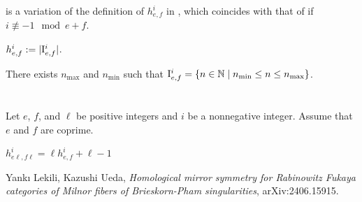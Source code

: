 
 is a variation
of the definition of $h_{e,f}^i$ in \cite{2406.15915},
which coincides with that of \cite{2406.15915}
if $i \not \equiv -1 \mod e+f$.

\begin{definition}
\label{def:h}
\leanok
$
h_{e,f}^i
:=
|\mathrm{I}_{e,f}^i|
$.
\end{definition}

\begin{lemma}
There exists $n_{\max}$ and $n_{\min}$ such that
$\mathrm{I}_{e,f}^i = \{n \in \mathbb{N} \mid n_{\min} \le n \le n_{\max}\}$.
\end{lemma}

\section{}

Let $e$, $f$, and $\ell$ be positive integers
and $i$ be a nonnegative integer.
Assume that $e$ and $f$ are coprime.

\begin{proposition}[{\cite[Proposition 5.1]{2406.15915}}]
\label{prop:main}
$
h_{e \ell, f \ell}^i = \ell h_{e,f}^i + \ell - 1
$
\end{proposition}

\begin{thebibliography}{LU}
Yank{\i} Lekili, Kazushi Ueda,
\emph{Homological mirror symmetry for Rabinowitz Fukaya categories
of Milnor fibers of Brieskorn-Pham singularities},
arXiv:2406.15915.
\end{thebibliography}